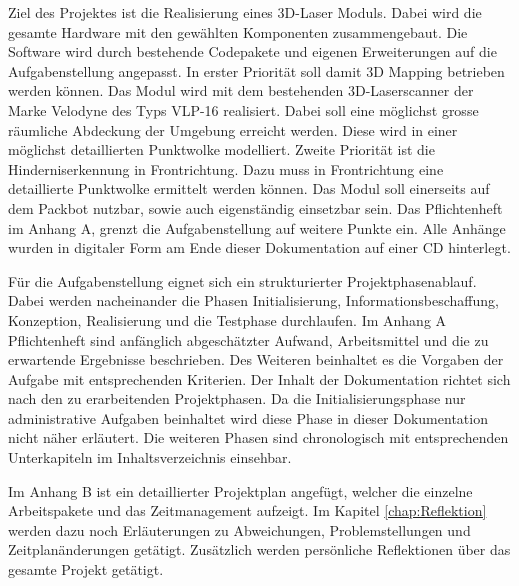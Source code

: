 Ziel des Projektes ist die Realisierung eines 3D-Laser Moduls. Dabei wird die gesamte Hardware mit den gewählten Komponenten zusammengebaut. Die Software wird durch bestehende Codepakete und eigenen Erweiterungen auf die Aufgabenstellung angepasst. In erster Priorität soll damit 3D Mapping betrieben werden können. Das Modul wird mit dem bestehenden 3D-Laserscanner der Marke Velodyne des Typs VLP-16 realisiert. Dabei soll eine möglichst grosse räumliche Abdeckung der Umgebung erreicht werden. Diese wird in einer möglichst detaillierten Punktwolke modelliert. Zweite Priorität ist die Hinderniserkennung in Frontrichtung. Dazu muss in Frontrichtung eine detaillierte Punktwolke ermittelt werden können. Das Modul soll einerseits auf dem Packbot nutzbar, sowie auch eigenständig einsetzbar sein. Das Pflichtenheft im Anhang A, grenzt die Aufgabenstellung auf weitere Punkte ein. Alle Anhänge wurden in digitaler Form am Ende dieser Dokumentation auf einer CD hinterlegt. 

Für die Aufgabenstellung eignet sich ein strukturierter Projektphasenablauf. Dabei werden nacheinander die Phasen Initialisierung, Informationsbeschaffung, Konzeption, Realisierung und die Testphase durchlaufen. Im Anhang A Pflichtenheft sind anfänglich abgeschätzter Aufwand, Arbeitsmittel und die zu erwartende Ergebnisse beschrieben. Des Weiteren beinhaltet es die Vorgaben der Aufgabe mit entsprechenden Kriterien.
Der Inhalt der Dokumentation richtet sich nach den zu erarbeitenden Projektphasen. Da die Initialisierungsphase nur administrative Aufgaben beinhaltet wird diese Phase in dieser Dokumentation nicht näher erläutert. Die weiteren Phasen sind chronologisch mit entsprechenden Unterkapiteln im Inhaltsverzeichnis einsehbar. 

Im Anhang B ist ein detaillierter Projektplan angefügt, welcher die einzelne Arbeitspakete und das Zeitmanagement aufzeigt. Im Kapitel \ref{chap:Reflektion} werden dazu noch Erläuterungen zu Abweichungen, Problemstellungen und Zeitplanänderungen getätigt. Zusätzlich werden persönliche Reflektionen über das gesamte Projekt getätigt. 







